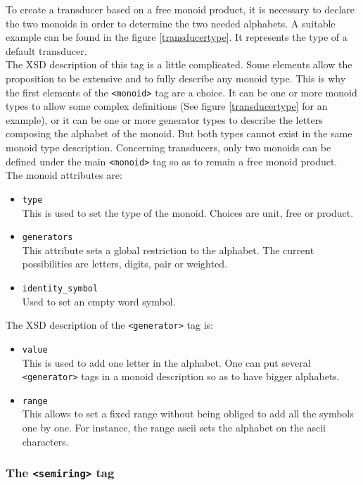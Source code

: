 \documentclass[a4paper]{llncs}
\def\monoidtag{\texttt{<monoid>}}
\def\semiringtag{\texttt{<semiring>}}
\def\generatortag{\texttt{<generator>}}
\begin{document}
To create a transducer based on a free monoid product, it is necessary to
declare the two monoids in order to determine the two needed alphabets. A
suitable example can be found in the figure \ref{transducertype}. It represents
the type of a default transducer.\\

The XSD description of this tag is a little complicated. Some elements allow
the proposition to be extensive and to fully describe any monoid type. This is
why the first elements of the \monoidtag{} tag are a choice. It can be one or
more monoid types to allow some complex definitions (See figure
\ref{transducertype} for an example), or it can be one or more generator types
to describe the letters composing the alphabet of the monoid. But both types
cannot exist in the same monoid type description. Concerning transducers, only
two monoids can be defined under the main \monoidtag{} tag so as to remain a
free monoid product.\\

The monoid attributes are:
\begin{itemize}
  \item \texttt{type}\\
This is used to set the type of the monoid. Choices are unit, free or product.
  \item \texttt{generators}\\
This attribute sets a global restriction to the alphabet. The current possibilities
are letters, digits, pair or weighted.
  \item \texttt{identity\_symbol}\\
Used to set an empty word symbol.
\end{itemize}
\newpage

The XSD description of the \generatortag{} tag is:
\begin{itemize}
  \item \texttt{value}\\
This is used to add one letter in the alphabet. One can put several
\generatortag{} tags in a monoid description so as to have bigger alphabets.
  \item \texttt{range}\\
This allows to set a fixed range without being obliged to add all the symbols
one by one. For instance, the range ascii sets the alphabet on the ascii
characters.
\end{itemize}

\subsubsection{The \semiringtag{} tag}
\end{document}
